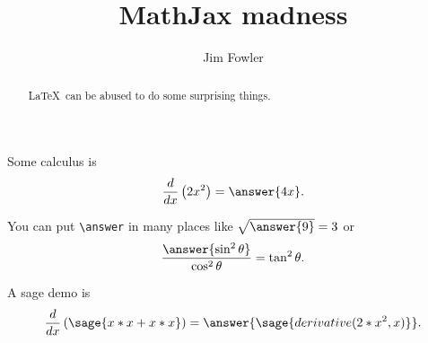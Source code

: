 \documentclass{ximera}
\title{MathJax madness}
\author{Jim Fowler}
\begin{document}
\begin{abstract}
  \LaTeX\ can be abused to do some surprising things.
\end{abstract}

\maketitle

\begin{problem}
  Some calculus is
  \[
    \frac{d}{dx} \left( 2x^2 \right) = \answer{4x}.
  \]

  You can put \verb|\answer| in many places
    like \(\sqrt{\answer{9}} = 3\)
    or \[
      \frac{\answer{\sin^2 \theta}}{\cos^2 \theta} = \tan^2 \theta.
    \]
\end{problem}

\begin{problem}
  A sage demo is
  \[
    \frac{d}{dx} \left( \sage{x*x + x*x} \right) =
      \answer{\sage{derivative(2*x^2,x)}}.
  \]
\end{problem}
\end{document}
